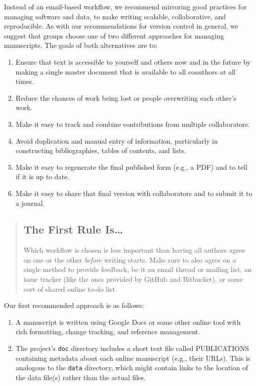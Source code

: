 \documentclass[10pt]{article}
\begin{document}
Instead of an email-based workflow, we recommend mirroring good
practices for managing software and data, to make writing scalable,
collaborative, and reproducible. As with our recommendations for version
control in general, we suggest that groups choose one of two different
approaches for managing manuscripts. The goals of both alternatives are
to:

\begin{enumerate}
\item
  Ensure that text is accessible to yourself and others now and in the
  future by making a single master document that is available to all
  coauthors at all times.
\item
  Reduce the chances of work being lost or people overwriting each
  other's work.
\item
  Make it easy to track and combine contributions from multiple
  collaborators.
\item
  Avoid duplication and manual entry of information, particularly in
  constructing bibliographies, tables of contents, and lists.
\item
  Make it easy to regenerate the final published form (e.g., a PDF) and
  to tell if it is up to date.
\item
  Make it easy to share that final version with collaborators and to
  submit it to a journal.
\end{enumerate}

\begin{quote}
\subsection*{The First Rule Is{\ldots}}

Which workflow is chosen is less important than having all authors agree
on one or the other \emph{before} writing starts. Make sure to also
agree on a single method to provide feedback, be it an email thread or
mailing list, an issue tracker (like the ones provided by GitHub and
Bitbucket), or some sort of shared online to-do list.
\end{quote}

Our first recommended approach is as follows:

\begin{enumerate}
\item
  A manuscript is written using Google Docs or some other online tool
  with rich formatting, change tracking, and reference management.
\item
  The project's \texttt{doc} directory includes a short text file called
  PUBLICATIONS containing metadata about each online manuscript (e.g.,
  their URLs). This is analogous to the \texttt{data} directory, which
  might contain links to the location of the data file(s) rather than
  the actual files.
\end{enumerate}
\end{document}
